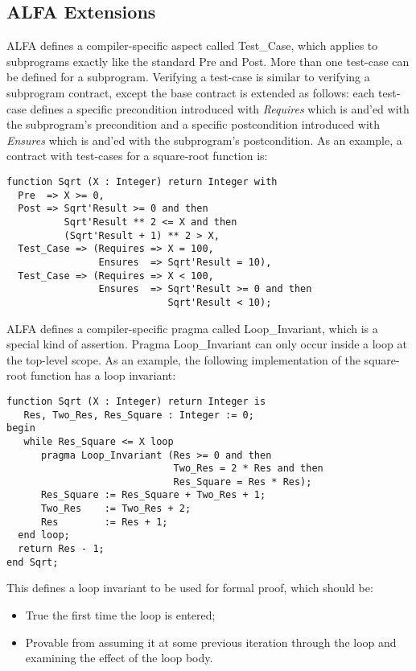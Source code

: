 \documentclass{article}
\begin{document}
\subsection{ALFA Extensions}

ALFA defines a compiler-specific aspect called Test\_Case, which applies to
subprograms exactly like the standard Pre and Post. More than one test-case can
be defined for a subprogram. Verifying a test-case is similar to verifying a
subprogram contract, except the base contract is extended as follows: each
test-case defines a specific precondition introduced with \textit{Requires}
which is and'ed with the subprogram's precondition and a specific postcondition
introduced with \textit{Ensures} which is and'ed with the subprogram's
postcondition. As an example, a contract with test-cases for a square-root
function is:

\begin{verbatim}
function Sqrt (X : Integer) return Integer with
  Pre  => X >= 0,
  Post => Sqrt'Result >= 0 and then
          Sqrt'Result ** 2 <= X and then
          (Sqrt'Result + 1) ** 2 > X,
  Test_Case => (Requires => X = 100, 
                Ensures  => Sqrt'Result = 10),
  Test_Case => (Requires => X < 100, 
                Ensures  => Sqrt'Result >= 0 and then 
                            Sqrt'Result < 10);
\end{verbatim}

ALFA defines a compiler-specific pragma called Loop\_Invariant, which is a
special kind of assertion. Pragma Loop\_Invariant can only occur inside a
loop at the top-level scope. As an example, the following implementation of the
square-root function has a loop invariant:

\begin{verbatim}
function Sqrt (X : Integer) return Integer is
   Res, Two_Res, Res_Square : Integer := 0;
begin
   while Res_Square <= X loop
      pragma Loop_Invariant (Res >= 0 and then
                             Two_Res = 2 * Res and then
                             Res_Square = Res * Res);
      Res_Square := Res_Square + Two_Res + 1;
      Two_Res    := Two_Res + 2;
      Res        := Res + 1;
  end loop;
  return Res - 1;
end Sqrt;
\end{verbatim}

This defines a loop invariant to be used for formal proof, which should be:
\begin{itemize}
\item True the first time the loop is entered;
\item Provable from assuming it at some previous iteration through the loop and
  examining the effect of the loop body.
\end{itemize}
\end{document}
